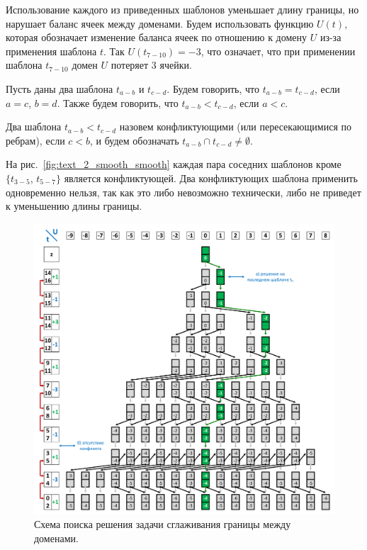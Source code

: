 Использование каждого из приведенных шаблонов уменьшает длину границы, но нарушает баланс ячеек между доменами.
Будем использовать функцию $U(t)$, которая обозначает изменение баланса ячеек по отношению к домену $U$ из-за применения шаблона $t$.
Так $U(t_{7-10}) = -3$, что означает, что при применении шаблона $t_{7-10}$ домен $U$ потеряет 3 ячейки.

\begin{definition}
Пусть даны два шаблона $t_{a-b}$ и $t_{c-d}$.
Будем говорить, что $t_{a-b} = t_{c-d}$, если $a = c$, $b = d$.
Также будем говорить, что $t_{a-b} < t_{c-d}$, если $a < c$.
\end{definition}

\begin{definition}
Два шаблона $t_{a-b} < t_{c-d}$ назовем конфликтующими (или пересекающимися по ребрам), если $c < b$, и будем обозначать $t_{a-b} \cap t_{c-d} \ne \emptyset$.
\end{definition}

На рис.~\ref{fig:text_2_smooth_smooth} каждая пара соседних шаблонов кроме $\{ t_{3-5}$, $t_{5-7} \}$ является конфликтующей.
Два конфликтующих шаблона применить одновременно нельзя, так как это либо невозможно технически, либо не приведет к уменьшению длины границы.

\begin{figure}[!ht]
\centering
\includegraphics[width=1.0\textwidth]{fig/par_smooth-scheme-cut.pdf}
\singlespacing
{}\caption{Схема поиска решения задачи сглаживания границы между доменами.}
\label{fig:text_2_smooth_smooth_scheme}
\end{figure}

